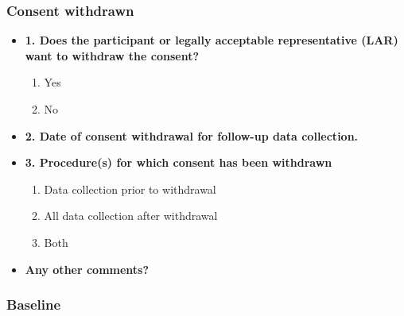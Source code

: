 \documentclass[
]{scrartcl}
\providecommand{\tightlist}{%
  \setlength{\itemsep}{0pt}\setlength{\parskip}{0pt}}\usepackage{longtable,booktabs,array}
\begin{document}
\hypertarget{consent-withdrawn}{%
\subsubsection{Consent withdrawn}\label{consent-withdrawn}}

\begin{itemize}
\item
  \textbf{1. Does the participant or legally acceptable representative
  (LAR) want to withdraw the consent?}

  \begin{enumerate}
  \def\labelenumi{\arabic{enumi}.}
  \tightlist
  \item
    Yes
  \item
    No
  \end{enumerate}
\item
  \textbf{2. Date of consent withdrawal for follow-up data collection.}
\item
  \textbf{3. Procedure(s) for which consent has been withdrawn}

  \begin{enumerate}
  \def\labelenumi{\arabic{enumi}.}
  \tightlist
  \item
    Data collection prior to withdrawal
  \item
    All data collection after withdrawal
  \item
    Both
  \end{enumerate}
\item
  \textbf{Any other comments?}
\end{itemize}

\hypertarget{baseline}{%
\subsubsection{Baseline}\label{baseline}}
\end{document}

